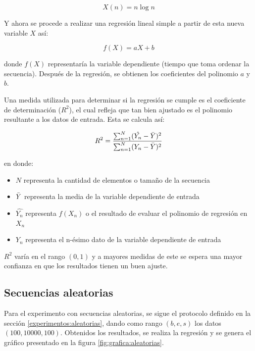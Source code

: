 \documentclass[letter]{article}
\begin{document}
\[X(n) = n \log n\]

Y ahora se procede a realizar una regresión lineal simple a partir de esta nueva variable $X$ así:

\[f(X) = aX + b\]

donde $f(X)$ representaría la variable dependiente (tiempo que toma ordenar la secuencia). Después de la regresión, se obtienen los coeficientes del polinomio $a$ y $b$. \par

Una medida utilizada para determinar si la regresión se cumple es el coeficiente de determinación ($R^{2}$), el cual refleja que tan bien ajustado es el polinomio resultante a los datos de entrada. Esta se calcula así:

\[R^{2} = \frac{\sum_{n=1}^{N} (\hat{Y_n} - \Bar{Y})^2}{\sum_{n=1}^{N} (Y_n - \Bar{Y})^2} \]

en donde:

\begin{itemize}
    \item $N$ representa la cantidad de elementos o tamaño de la secuencia
    \item $\Bar{Y}$ representa la media de la variable dependiente de entrada
    \item $\hat{Y_n}$ representa $f(X_n)$ o el resultado de evaluar el polinomio de regresión en $X_n$
    \item $Y_n$ representa el n-ésimo dato de la variable dependiente de entrada
\end{itemize}

$R^2$ varía en el rango $(0,1)$ y a mayores medidas de este se espera una mayor confianza en que los resultados tienen un buen ajuste.\par

\subsection{Secuencias aleatorias} \label{resultados:aleatorias}

Para el experimento con secuencias aleatorias, se sigue el protocolo definido en la sección \ref{experimentos:aleatorias}, dando como rango $(b,e,s)$ los datos $(100,10000,100)$. Obtenidos los resultados, se realiza la regresión y se genera el gráfico presentado en la figura \ref{fig:grafica:aleatorias}.
\end{document}
